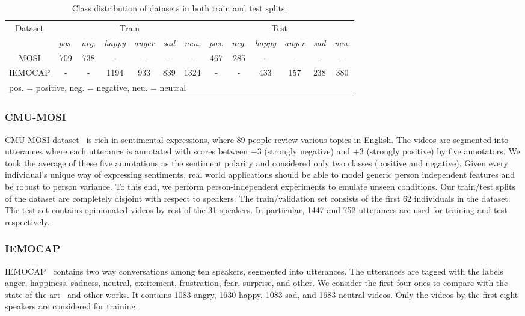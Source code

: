 \documentclass[review]{elsarticle}
\newcommand\?[1]{\hl{#1}}
\begin{document}
\begin{table}[h]
	\small
	      \addtolength\tabcolsep{-5pt} \begin{center}
		\begin{tabular}{|*{14}{c|}}
			\hline
			\multicolumn{2}{|c|}{\multirow{2}{*}{Dataset}} & \multicolumn{6}{c|}{Train} & \multicolumn{6}{c|}{Test}\\ \cline{3-14}
			\multicolumn{2}{|c|}{}& \emph{pos.}&\emph{neg.}&\emph{happy}&\emph{anger}&\emph{sad}&\emph{neu.}&\emph{pos.}&\emph{neg.}&\emph{happy}&\emph{anger}&\emph{sad}&\emph{neu.}\\ \hline
			\multicolumn{2}{|c|}{MOSI}&709&738&-&-&-&-&467&285&-&-&-&-\\ \hline
			\multicolumn{2}{|c|}{IEMOCAP}&-&-&1194&933&839&1324&-&-&433&157&238&380\\ \hline
			\multicolumn{14}{l}{\scriptsize{pos. = positive, neg. = negative, neu. = neutral}}
		\end{tabular}
	\end{center}
	\vspace{-4.5mm}
	\caption {Class distribution of datasets in both train and test splits. }
	\label{tab:dataset}
\end{table}


\subsubsection{CMU-MOSI}
\label{sec:mosi}
CMU-MOSI dataset~\citep{zadeh2016multimodal} is rich in sentimental
expressions, where 89 people review various topics in English. The videos are
segmented into utterances where each utterance is annotated with scores between
$-3$ (strongly negative) and $+3$ (strongly positive) by five annotators. We
took the average of these five annotations as the sentiment polarity and
considered only two classes (positive and negative). Given every individual's
unique way of expressing sentiments, real world applications should be able to
model generic person independent features and be robust to person variance. To
this end, we perform person-independent experiments to emulate unseen
conditions. Our train/test splits of the dataset are completely disjoint with
respect to speakers. The train/validation set consists of the first 62
individuals in the dataset. The test set contains opinionated videos by rest of
the 31 speakers. In particular, 1447 and 752 utterances are used for training
and test respectively.

\subsubsection{IEMOCAP}
\label{sec:iemocap}
IEMOCAP~\citep{iemocap} contains two way conversations
among ten speakers, segmented into utterances. The utterances are tagged with
the labels anger, happiness, sadness, neutral, excitement, frustration, fear,
surprise, and other. We consider the first four ones to compare with the
state of the art~\citep{porcon} and other works. It contains 1083
angry, 1630 happy, 1083 sad, and 1683 neutral videos. Only the videos by the
first eight speakers are considered for training.
\end{document}
